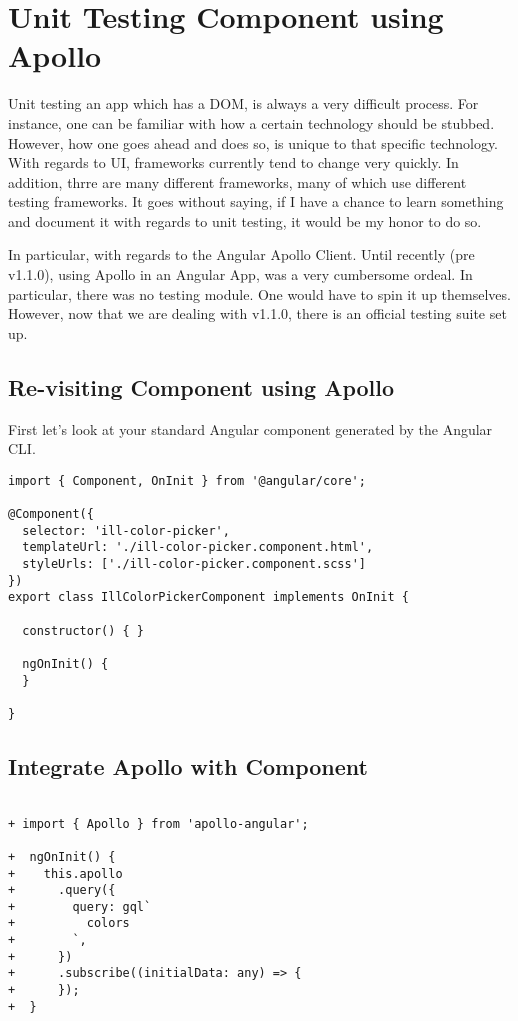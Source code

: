 \maketitle{}
\section{ Unit Testing Component using Apollo }

Unit testing an app which has a DOM, is always a very difficult process. For
instance, one can be familiar with how a certain technology should be stubbed.
However, how one goes ahead and does so, is unique to that specific technology.
With regards to UI, frameworks currently tend to change very quickly. In
addition, thrre are many different frameworks, many of which use different
testing frameworks. It goes without saying, if I have a chance to learn
something and document it with regards to unit testing, it would be my honor to
do so.

In particular, with regards to the Angular Apollo Client. Until recently
(pre v1.1.0), using Apollo in an Angular App, was a very cumbersome ordeal.
In particular, there was no testing module. One would have to spin it up
themselves. However, now that we are dealing with v1.1.0, there is an official
testing suite set up.

\subsection { Re-visiting Component using Apollo }
First let's look at your standard Angular component generated by the Angular
CLI.

\begin{lstlisting}
import { Component, OnInit } from '@angular/core';

@Component({
  selector: 'ill-color-picker',
  templateUrl: './ill-color-picker.component.html',
  styleUrls: ['./ill-color-picker.component.scss']
})
export class IllColorPickerComponent implements OnInit {

  constructor() { }

  ngOnInit() {
  }

}
\end{lstlisting}

\subsection { Integrate Apollo with Component }

\begin{lstlisting}

+ import { Apollo } from 'apollo-angular';

+  ngOnInit() {
+    this.apollo
+      .query({
+        query: gql`
+          colors
+        `,
+      })
+      .subscribe((initialData: any) => {
+      });
+  }
\end{lstlisting}

